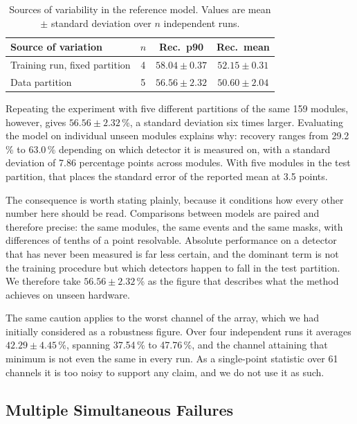 \documentclass[10pt,conference]{IEEEtran}
\begin{document}
\begin{table}[t]
\centering
\caption{Sources of variability in the reference model. Values are
mean $\pm$ standard deviation over $n$ independent runs.}
\label{tab:reference}
\begin{tabular}{@{}lccc@{}}
\toprule
\textbf{Source of variation} & \textbf{$n$} & \textbf{Rec.\ p90} & \textbf{Rec.\ mean} \\
\midrule
Training run, fixed partition & 4 & $58.04 \pm 0.37$ & $52.15 \pm 0.31$ \\
Data partition                & 5 & $56.56 \pm 2.32$ & $50.60 \pm 2.04$ \\
\bottomrule
\end{tabular}
\end{table}

Repeating the experiment with five different partitions of the same 159
modules, however, gives $56.56 \pm 2.32$\,\%, a standard deviation six times
larger. Evaluating the model on individual unseen modules explains why:
recovery ranges from
29.2\,\% to 63.0\,\% depending on which detector it is measured on, with a
standard deviation of 7.86 percentage points across modules. With five modules
in the test partition, that places the standard error of the reported mean at
3.5 points.

The consequence is worth stating plainly, because it conditions how every other
number here should be read. Comparisons between models are paired and therefore
precise: the same modules, the same events and the same masks, with
differences of tenths of a point resolvable. Absolute performance on a detector
that has never been measured is far less certain, and the dominant term is not
the training procedure but which detectors happen to fall in the test
partition. We therefore take $56.56 \pm 2.32$\,\% as the figure that describes
what the method achieves on unseen hardware.

The same caution applies to the worst channel of the array, which we had
initially considered as a robustness figure. Over four independent runs it
averages $42.29 \pm 4.45$\,\%, spanning 37.54\,\% to 47.76\,\%, and the channel
attaining that minimum is not even the same in every run. As a single-point
statistic over 61 channels it is too noisy to support any claim, and we do not
use it as such.

\subsection{Multiple Simultaneous Failures}
\label{sec:res-multidead}
\end{document}
